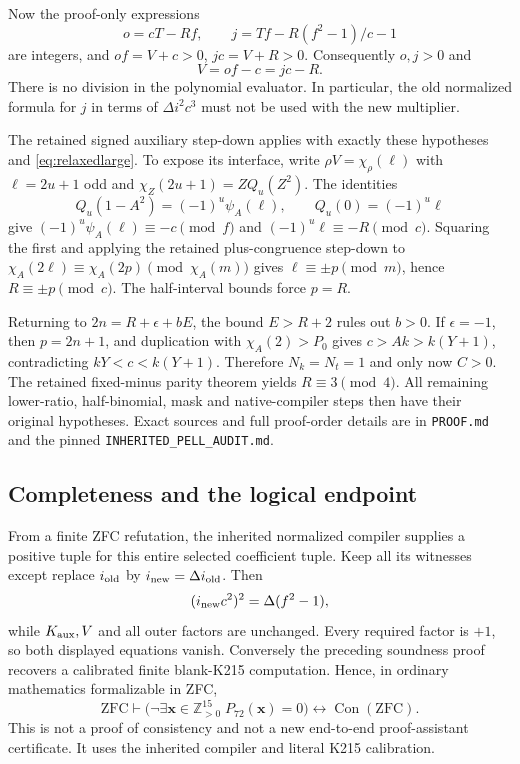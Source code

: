 Now the proof-only expressions
\[
 o=cT-Rf,\qquad j=Tf-R(f^2-1)/c-1
\]
are integers, and $of=V+c>0$, $jc=V+R>0$. Consequently $o,j>0$ and
\[
 V=of-c=jc-R.
\]
There is no division in the polynomial evaluator. In particular, the old
normalized formula for $j$ in terms of $\Delta i^2c^3$ must not be used
with the new multiplier.

The retained signed auxiliary step-down applies with exactly these
hypotheses and \eqref{eq:relaxedlarge}. To expose its interface, write
$\rho V=\chi_\rho(\ell)$ with $\ell=2u+1$ odd and
$\chi_Z(2u+1)=ZQ_u(Z^2)$. The identities
\[
 Q_u(1-A^2)=(-1)^u\psi_A(\ell),\qquad Q_u(0)=(-1)^u\ell
\]
give $(-1)^u\psi_A(\ell)\equiv-c\pmod f$ and
$(-1)^u\ell\equiv-R\pmod c$.
Squaring the first and applying the retained plus-congruence step-down to
$\chi_A(2\ell)\equiv\chi_A(2p)\pmod{\chi_A(m)}$ gives
$\ell\equiv\pm p\pmod m$, hence $R\equiv\pm p\pmod c$.
The half-interval bounds force $p=R$.

Returning to $2n=R+\epsilon+bE$, the bound $E>R+2$ rules out $b>0$.
If $\epsilon=-1$, then $p=2n+1$, and duplication with
$\chi_A(2)>P_0$ gives $c>Ak>k(Y+1)$, contradicting
$kY<c<k(Y+1)$. Therefore $N_k=N_t=1$ and only now $C>0$.
The retained fixed-minus parity theorem yields $R\equiv3\pmod4$.
All remaining lower-ratio, half-binomial, mask and native-compiler steps
then have their original hypotheses. Exact sources and full proof-order
details are in \texttt{PROOF.md} and the pinned
\texttt{INHERITED\_PELL\_AUDIT.md}.

\subsection{Completeness and the logical endpoint}
From a finite ZFC refutation, the inherited normalized compiler supplies
a positive tuple for this entire selected coefficient tuple. Keep all
its witnesses except replace $i_{\rm old}$ by
$i_{\rm new}=\Delta i_{\rm old}$. Then
\[
 (i_{\rm new}c^2)^2=\Delta(f^2-1),
\]
while $K_{\rm aux},V$ and all outer factors are unchanged. Every required
factor is $+1$, so both displayed equations vanish. Conversely the
preceding soundness proof recovers a calibrated finite blank-K215
computation. Hence, in ordinary mathematics formalizable in ZFC,
\[
 \mathrm{ZFC}\vdash
 \bigl(\neg\exists\mathbf x\in\mathbb Z_{>0}^{15}\;P_{72}(\mathbf x)=0\bigr)
 \longleftrightarrow\operatorname{Con}(\mathrm{ZFC}).
\]
This is not a proof of consistency and not a new end-to-end proof-assistant
certificate. It uses the inherited compiler and literal K215 calibration.

